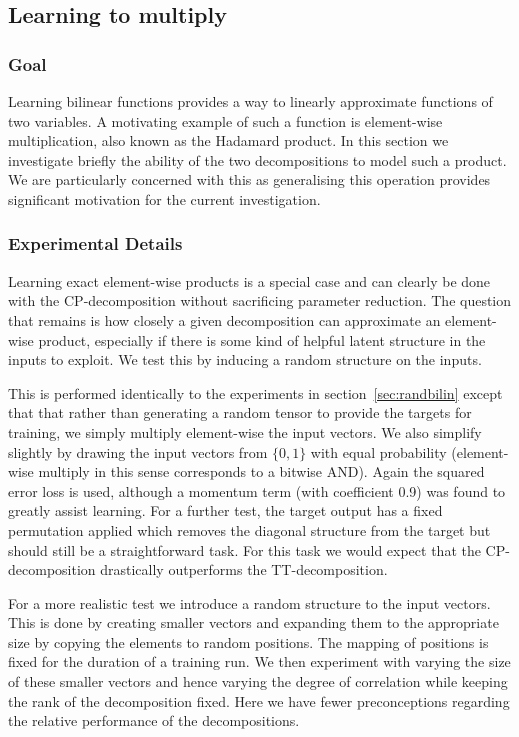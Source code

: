 \subsection{Learning to multiply}
\subsubsection{Goal}
Learning bilinear functions provides a way to linearly approximate functions of two variables.
A motivating example of such a function is element-wise multiplication, also known as the Hadamard
product. In this section we investigate briefly the ability of the two decompositions to model
such a product. We are particularly concerned with this as generalising this operation provides
significant motivation for the current investigation.


\subsubsection{Experimental Details}
Learning exact element-wise products is a special case and can clearly be done with the 
CP-decomposition without sacrificing parameter reduction. The question that remains is how closely
a given decomposition can approximate an element-wise product, especially if there is some kind of
helpful latent structure in the inputs to exploit. We test this by inducing a random structure
on the inputs.

This is performed identically to the experiments in section~\ref{sec:randbilin}
except that that rather than generating a random tensor to provide the targets for training,
we simply multiply element-wise the input vectors. We also simplify slightly by drawing the
input vectors from \(\{0,1\}\) with equal probability
(element-wise multiply in this sense corresponds to a bitwise AND). 
Again the squared error loss is used, although
a momentum term (with coefficient 0.9) was found to greatly assist learning.
For a further test, the target
output has a fixed permutation applied which removes the diagonal structure from the target but
should still be a straightforward task. For this task we would
expect that the CP-decomposition drastically outperforms the TT-decomposition.

For a more realistic test we introduce a random structure to the input vectors. This is done by
creating smaller vectors and expanding them to the appropriate size by copying the
elements to random positions. The mapping of positions is fixed for the duration of a training
run. We then experiment with varying the size of these smaller vectors and hence varying the
degree of correlation while keeping the rank of the decomposition fixed. Here we have fewer
preconceptions regarding the relative performance of the decompositions.

